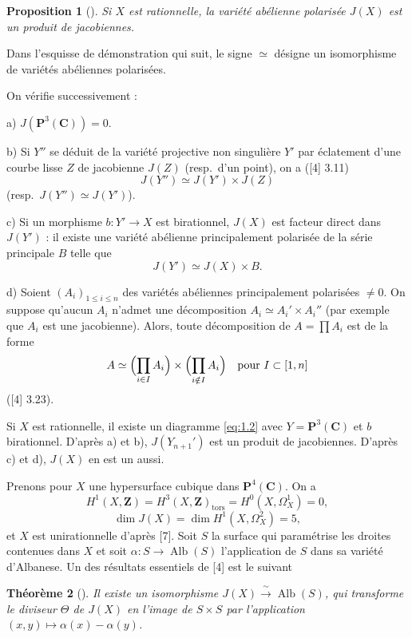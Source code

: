 \documentclass[12pt]{amsart}
\theoremstyle{plain}
\newtheorem{theoreme}{Th\'eor\`eme}[section]
\newtheorem{proposition}[theoreme]{Proposition}
\theoremstyle{definition}
\theoremstyle{remark}
\DeclareMathOperator{\Alb}{Alb}
\begin{document}
\begin{proposition}[{\cite[3.26]{4}}]\label{prop:2.3}
Si $X$ est rationnelle, la vari\'et\'e ab\'elienne polaris\'ee
$J(X)$ est un produit de jacobiennes.
\end{proposition}

Dans l'esquisse de d\'emonstration qui suit, le signe $\simeq$ d\'esigne un isomorphisme
de vari\'et\'es ab\'eliennes polaris\'ees.

On v\'erifie successivement :

a) $J(\mathbf{P}^3(\mathbf{C})) = 0$.

b) Si $Y''$ se d\'eduit de la vari\'et\'e projective non singuli\`ere $Y'$ par \'eclatement
d'une courbe lisse $Z$ de jacobienne $J(Z)$ (resp.\ d'un point), on a ([4] 3.11)
\[
J(Y'') \simeq J(Y') \times J(Z)
\]
(resp.\ $J(Y'') \simeq J(Y')$).

c) Si un morphisme $b: Y' \to X$ est birationnel, $J(X)$ est facteur direct dans
$J(Y')$ : il existe une vari\'et\'e ab\'elienne principalement polaris\'ee de la s\'erie
principale $B$ telle que
\[
J(Y') \simeq J(X) \times B.
\]

d) Soient $(A_i)_{1 \leqslant i \leqslant n}$ des vari\'et\'es ab\'eliennes principalement polaris\'ees $\neq 0$.
On suppose qu'aucun $A_i$ n'admet une d\'ecomposition $A_i \simeq A_i' \times A_i''$ (par exemple
que $A_i$ est une jacobienne). Alors, toute d\'ecomposition de $A = \prod A_i$ est de la
forme
\[
A \simeq \Bigl(\prod_{i \in I} A_i\Bigr) \times \Bigl(\prod_{i \notin I} A_i\Bigr) \quad \text{pour } I \subset [1,n]
\]
([4] 3.23).

Si $X$ est rationnelle, il existe un diagramme \eqref{eq:1.2} avec $Y = \mathbf{P}^3(\mathbf{C})$ et $b$
birationnel. D'apr\`es a) et b), $J(Y_{n+1}')$ est un produit de jacobiennes. D'apr\`es
c) et d), $J(X)$ en est un aussi.

Prenons pour $X$ une hypersurface cubique dans $\mathbf{P}^4(\mathbf{C})$. On a
\[
H^1(X, \mathbf{Z}) = H^3(X, \mathbf{Z})_{\text{tors}} = H^0(X, \Omega_X^1) = 0,
\]
\[
\dim J(X) = \dim H^1(X, \Omega_X^2) = 5,
\]
et $X$ est unirationnelle d'apr\`es [7]. Soit $S$ la surface qui param\'etrise les
droites contenues dans $X$ et soit $\alpha: S \to \Alb(S)$ l'application de $S$ dans
sa vari\'et\'e d'Albanese. Un des r\'esultats essentiels de [4] est le suivant

\begin{theoreme}[{\cite[11.19 et 13.4]{4}}]\label{thm:2.4}
Il existe un isomorphisme $J(X) \xrightarrow{\;\sim\;} \Alb(S)$,
qui transforme le diviseur $\Theta$ de $J(X)$ en l'image de $S \times S$ par l'application
$(x,y) \longmapsto \alpha(x) - \alpha(y)$.
\end{theoreme}
\end{document}

